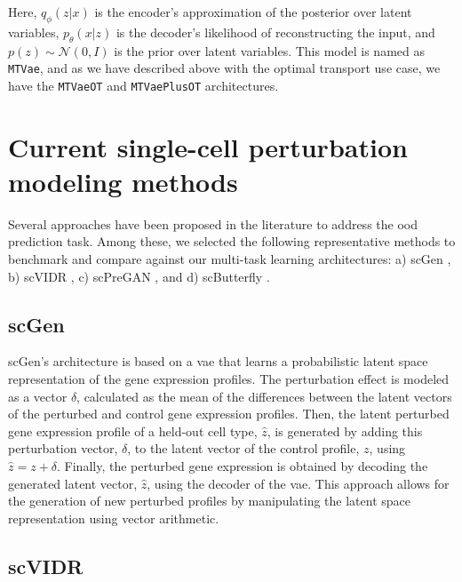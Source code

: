 \documentclass[12pt, a4paper]{article}
\begin{document}
Here, $q_\phi(z|x)$ is the encoder's approximation of the posterior over latent variables, $p_\theta(x|z)$ is the decoder's likelihood of reconstructing the input, and $p(z) \sim \mathcal{N}(0, I)$ is the prior over latent variables. This model is named as \verb|MTVae|, and as we have described above with the optimal transport use case, we have the \verb|MTVaeOT| and \verb|MTVaePlusOT| architectures.




\section{Current single-cell perturbation modeling methods}
\label{sec:benchmark_models}

Several approaches have been proposed in the literature to address the \gls{ood} prediction task. Among these, we selected the following representative methods to benchmark and compare against our multi-task learning architectures: a) scGen \cite{lotfollahiScGenPredictsSinglecell2019}, b) scVIDR \cite{kanaGenerativeModelingSinglecell2023}, c) scPreGAN \cite{weiScPreGANDeepGenerative2022}, and d) scButterfly \cite{caoScButterflyVersatileSinglecell2024}.

\subsection{scGen}

scGen's architecture is based on a \gls{vae} that learns a probabilistic latent space representation of the gene expression profiles. 
The perturbation effect is modeled as a vector $\delta$, calculated as the mean of the differences between the latent vectors of the perturbed and control gene expression profiles. Then, the latent perturbed gene expression profile of a held-out cell type, $\hat{z}$,  is generated by adding this perturbation vector, $\delta$, to the latent vector of the control profile, $z$, using $\hat{z} = z + \delta$. Finally, the perturbed gene expression is obtained by decoding the generated latent vector, $\hat{z}$, using the decoder of the \gls{vae}. This approach allows for the generation of new perturbed profiles by manipulating the latent space representation using vector arithmetic.

\subsection{scVIDR}
 
\end{document}
